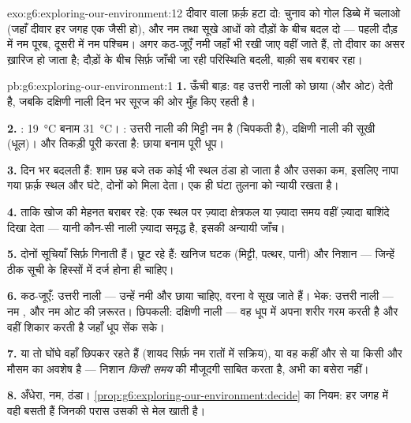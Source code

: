 \begin{solution}{exo:g6:exploring-our-environment:12}
दीवार वाला फ़र्क़ हटा दो: चुनाव को गोल डिब्बे में चलाओ (जहाँ दीवार हर
जगह एक जैसी हो), और नम तथा सूखे आधों को दौड़ों के बीच बदल दो --- पहली
दौड़ में नम पूरब, दूसरी में नम पश्चिम। अगर कठ-जूएँ नमी जहाँ भी रखी जाए
वहीं जाते हैं, तो दीवार का असर ख़ारिज हो जाता है; दौड़ों के बीच सिर्फ़
जाँची जा रही परिस्थिति बदली, बाक़ी सब बराबर रहा।
\end{solution}

\begin{solution}{pb:g6:exploring-our-environment:1}
\textbf{1.} ऊँची बाड़: वह उत्तरी नाली को छाया (और ओट) देती है, जबकि दक्षिणी नाली
दिन भर सूरज की ओर मुँह किए रहती है।

\textbf{2.} : \qty{19}{\degreeCelsius} बनाम
\qty{31}{\degreeCelsius}। : उत्तरी नाली की मिट्टी नम है (चिपकती
है), दक्षिणी नाली की सूखी (धूल)। और  तिकड़ी पूरी करता है: छाया बनाम
पूरी धूप।

\textbf{3.}  दिन भर बदलती हैं: शाम छह बजे तक कोई भी स्थल
ठंडा हो जाता है और उसका  कम, इसलिए नापा गया फ़र्क़ स्थल और घंटे,
दोनों को मिला देता। एक ही घंटा तुलना को न्यायी रखता है।

\textbf{4.} ताकि खोज की मेहनत बराबर रहे: एक स्थल पर ज़्यादा क्षेत्रफल
या ज़्यादा समय वहीं ज़्यादा बाशिंदे दिखा देता --- यानी कौन-सी नाली
ज़्यादा समृद्ध है, इसकी अन्यायी जाँच।

\textbf{5.} दोनों सूचियाँ सिर्फ़  गिनाती हैं। छूट रहे हैं: खनिज
घटक (मिट्टी, पत्थर, पानी) और निशान --- जिन्हें ठीक सूची के हिस्सों में
दर्ज होना ही चाहिए।

\textbf{6.} कठ-जूएँ: उत्तरी नाली --- उन्हें नमी और छाया चाहिए, वरना वे सूख
जाते हैं। भेक: उत्तरी नाली --- नम , और नम ओट की ज़रूरत। छिपकली: दक्षिणी नाली
--- वह धूप में अपना शरीर गरम करती है और वहीं शिकार करती है जहाँ धूप सेंक
सके।

\textbf{7.} या तो घोंघे वहाँ छिपकर रहते हैं (शायद सिर्फ़ नम रातों में
सक्रिय), या वह  कहीं और से या किसी और मौसम का अवशेष है --- निशान
\emph{किसी समय} की मौजूदगी साबित करता है, अभी का बसेरा नहीं।

\textbf{8.} अँधेरा, नम, ठंडा।
\cref{prop:g6:exploring-our-environment:decide} का नियम: हर जगह में वही
 बसती हैं जिनकी परास उसकी  से मेल खाती है।


\end{solution}
